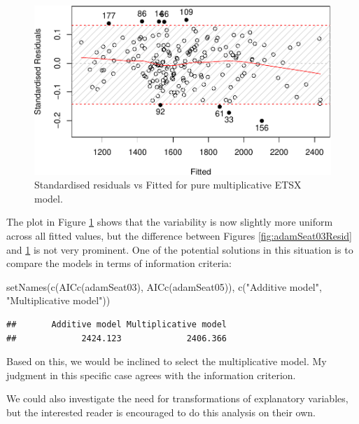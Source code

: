 \documentclass[
]{book}
\newenvironment{Shaded}{\begin{snugshade}}{\end{snugshade}}
\newcommand{\FunctionTok}[1]{\textcolor[rgb]{0.00,0.00,0.00}{#1}}
\newcommand{\NormalTok}[1]{#1}
\newcommand{\StringTok}[1]{\textcolor[rgb]{0.31,0.60,0.02}{#1}}
\theoremstyle{definition}
\theoremstyle{definition}
\theoremstyle{definition}
\theoremstyle{definition}
\theoremstyle{remark}
\begin{document}
\begin{figure}
\centering
\includegraphics{Svetunkov--2022----ADAM_files/figure-latex/adamSeat05Resid-1.pdf}
\caption{\label{fig:adamSeat05Resid}Standardised residuals vs Fitted for pure multiplicative ETSX model.}
\end{figure}

The plot in Figure \ref{fig:adamSeat05Resid} shows that the variability is now slightly more uniform across all fitted values, but the difference between Figures \ref{fig:adamSeat03Resid} and \ref{fig:adamSeat05Resid} is not very prominent. One of the potential solutions in this situation is to compare the models in terms of information criteria:

\begin{Shaded}
\begin{Highlighting}[]
\FunctionTok{setNames}\NormalTok{(}\FunctionTok{c}\NormalTok{(}\FunctionTok{AICc}\NormalTok{(adamSeat03), }\FunctionTok{AICc}\NormalTok{(adamSeat05)),}
         \FunctionTok{c}\NormalTok{(}\StringTok{"Additive model"}\NormalTok{, }\StringTok{"Multiplicative model"}\NormalTok{))}
\end{Highlighting}
\end{Shaded}

\begin{verbatim}
##       Additive model Multiplicative model 
##             2424.123             2406.366
\end{verbatim}

Based on this, we would be inclined to select the multiplicative model. My judgment in this specific case agrees with the information criterion.

We could also investigate the need for transformations of explanatory variables, but the interested reader is encouraged to do this analysis on their own.
\end{document}
